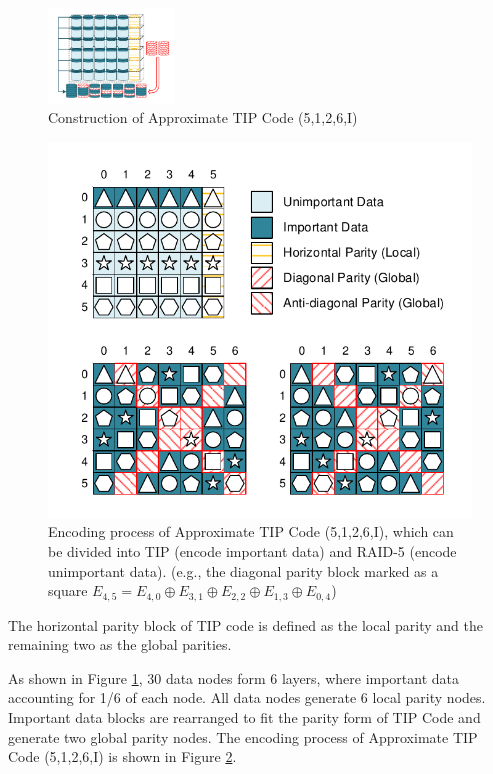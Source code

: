 \documentclass[sigconf]{acmart}
\begin{document}
\begin{figure}[ht]
\centering
\includegraphics[width=0.3\textwidth]{photo/AP-5126.pdf}
\caption{Construction of Approximate TIP Code (5,1,2,6,I)}
\label{fig-ap-TIP}
\end{figure}

\begin{figure}[ht]
\centering
\includegraphics[width=0.8\linewidth]{photo/RAID5-TIP-v2.pdf}        
\caption{Encoding process of Approximate TIP Code (5,1,2,6,I), which can be divided into TIP (encode important data) and RAID-5 (encode unimportant data). (e.g., the diagonal parity block marked as a square $E_{4,5} = E_{4,0} \oplus E_{3,1} \oplus E_{2,2} \oplus E_{1,3} \oplus E_{0,4}$)}
\label{fig-TIP}
\end{figure}

The horizontal parity block of TIP code is defined as the local parity and the remaining two as the global parities. 

As shown in Figure \ref{fig-ap-TIP}, 30 data nodes form 6 layers, where important data accounting for 1/6 of each node.
All data nodes generate 6 local parity nodes.
Important data blocks are rearranged to fit the parity form of TIP Code and generate two global parity nodes.
The encoding process of Approximate TIP Code (5,1,2,6,I) is shown in Figure \ref{fig-TIP}.
\end{document}
